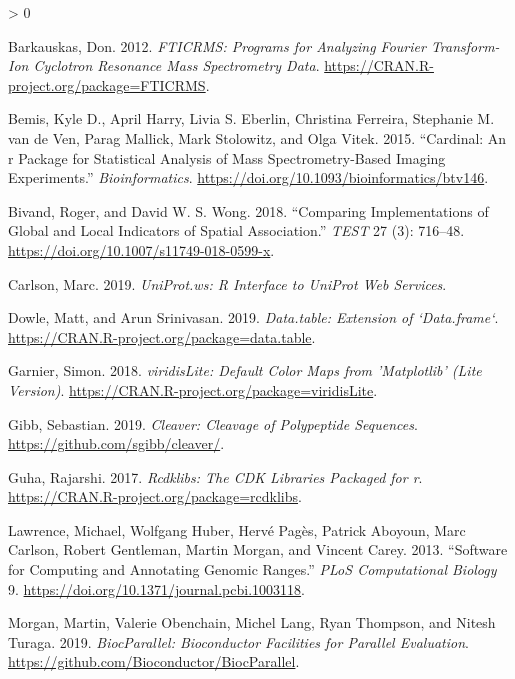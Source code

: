 \documentclass[
]{article}
\newlength{\cslhangindent}
\newenvironment{CSLReferences}[2] %
 {%
  \setlength{\parindent}{0pt}
  \ifodd #1 \everypar{\setlength{\hangindent}{\cslhangindent}}\ignorespaces\fi
  \ifnum #2 > 0
  \setlength{\parskip}{#2\baselineskip}
  \fi
 }%
 {}
\begin{document}
\hypertarget{refs}{}
\begin{CSLReferences}{1}{0}
\leavevmode\hypertarget{ref-FTICRMS}{}%
Barkauskas, Don. 2012. \emph{FTICRMS: Programs for Analyzing Fourier
Transform-Ion Cyclotron Resonance Mass Spectrometry Data}.
\url{https://CRAN.R-project.org/package=FTICRMS}.

\leavevmode\hypertarget{ref-Cardinal}{}%
Bemis, Kyle D., April Harry, Livia S. Eberlin, Christina Ferreira,
Stephanie M. van de Ven, Parag Mallick, Mark Stolowitz, and Olga Vitek.
2015. {``Cardinal: An r Package for Statistical Analysis of Mass
Spectrometry-Based Imaging Experiments.''} \emph{Bioinformatics}.
\url{https://doi.org/10.1093/bioinformatics/btv146}.

\leavevmode\hypertarget{ref-spdep1}{}%
Bivand, Roger, and David W. S. Wong. 2018. {``Comparing Implementations
of Global and Local Indicators of Spatial Association.''} \emph{TEST} 27
(3): 716--48. \url{https://doi.org/10.1007/s11749-018-0599-x}.

\leavevmode\hypertarget{ref-UniProt.ws}{}%
Carlson, Marc. 2019. \emph{UniProt.ws: R Interface to UniProt Web
Services}.

\leavevmode\hypertarget{ref-data.table}{}%
Dowle, Matt, and Arun Srinivasan. 2019. \emph{Data.table: Extension of
`Data.frame`}. \url{https://CRAN.R-project.org/package=data.table}.

\leavevmode\hypertarget{ref-viridisLite}{}%
Garnier, Simon. 2018. \emph{viridisLite: Default Color Maps from
'Matplotlib' (Lite Version)}.
\url{https://CRAN.R-project.org/package=viridisLite}.

\leavevmode\hypertarget{ref-cleaver}{}%
Gibb, Sebastian. 2019. \emph{Cleaver: Cleavage of Polypeptide
Sequences}. \url{https://github.com/sgibb/cleaver/}.

\leavevmode\hypertarget{ref-rcdklibs}{}%
Guha, Rajarshi. 2017. \emph{Rcdklibs: The CDK Libraries Packaged for r}.
\url{https://CRAN.R-project.org/package=rcdklibs}.

\leavevmode\hypertarget{ref-IRanges}{}%
Lawrence, Michael, Wolfgang Huber, Hervé Pagès, Patrick Aboyoun, Marc
Carlson, Robert Gentleman, Martin Morgan, and Vincent Carey. 2013.
{``Software for Computing and Annotating Genomic Ranges.''} \emph{{PLoS}
Computational Biology} 9.
\url{https://doi.org/10.1371/journal.pcbi.1003118}.

\leavevmode\hypertarget{ref-BiocParallel}{}%
Morgan, Martin, Valerie Obenchain, Michel Lang, Ryan Thompson, and
Nitesh Turaga. 2019. \emph{BiocParallel: Bioconductor Facilities for
Parallel Evaluation}.
\url{https://github.com/Bioconductor/BiocParallel}.


\end{CSLReferences}
\end{document}

